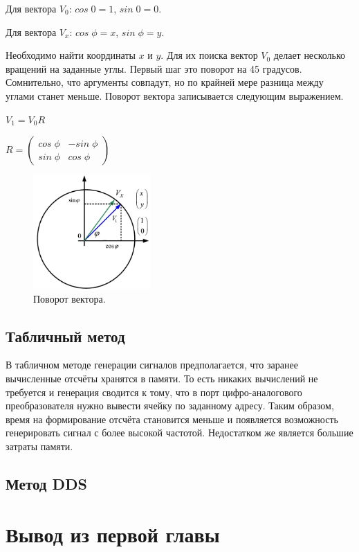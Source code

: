 Для вектора $V_{0}$: $cos\;0 = 1$, $sin\;0 = 0$. 

Для вектора $V_{x}$: $cos\;\phi = x$, $sin\;\phi = y$.

Необходимо найти координаты $x$ и $y$. Для их поиска вектор $V_{0}$ делает несколько вращений на заданные углы. Первый шаг это поворот на 45 градусов. Сомнительно, что аргументы совпадут, но по крайней мере разница между углами станет меньше. Поворот вектора записывается следующим выражением.

$V_{1} = V_{0}R$

$R=
\begin{pmatrix}
  cos\;\phi& -sin\;\phi\\
  sin\;\phi& cos\;\phi
\end{pmatrix}
$
	\begin{figure}[H]
    \centering
    \includegraphics[width=0.4\textwidth]{../image/cordic2.png}
    \caption{Поворот вектора.}
	\end{figure}
	
\subsection*{Табличный метод}		
	В табличном методе генерации сигналов предполагается, что заранее вычисленные отсчёты хранятся в памяти. То есть никаких вычислений не требуется и генерация сводится к тому, что в порт цифро-аналогового преобразователя нужно вывести ячейку по заданному адресу. Таким образом, время на формирование отсчёта становится меньше и появляется возможность генерировать сигнал с более высокой частотой. Недостатком же является большие затраты памяти.


\subsection*{Метод DDS}	

\section{Вывод из первой главы}
	
	
	